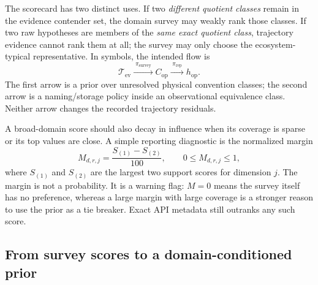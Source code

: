 \documentclass[11pt]{article}
\begin{document}
    The scorecard has two distinct uses. If two \emph{different quotient classes} remain in
    the evidence contender set, the domain survey may weakly rank those classes. If two raw
    hypotheses are members of the \emph{same exact quotient class}, trajectory evidence cannot
    rank them at all; the survey may only choose the ecosystem-typical representative. In
    symbols, the intended flow is
    \begin{equation}
        \boxed{
            \mathcal T_{\mathrm{ev}}
            \xrightarrow{\;\pi_{\mathrm{survey}}\;}
            C_{\mathrm{op}}
            \xrightarrow{\;\pi_{\mathrm{rep}}\;}
            h_{\mathrm{op}}.}
        \label{eq:survey-two-level-use}
    \end{equation}
    The first arrow is a prior over unresolved physical convention classes; the second arrow
    is a naming/storage policy inside an observational equivalence class. Neither arrow
    changes the recorded trajectory residuals.

    A broad-domain score should also decay in influence when its coverage is sparse or its
    top values are close. A simple reporting diagnostic is the normalized margin
    \begin{equation}
        M_{d,r,j}=\frac{S_{(1)}-S_{(2)}}{100},
        \qquad 0\le M_{d,r,j}\le1,
        \label{eq:survey-margin}
    \end{equation}
    where $S_{(1)}$ and $S_{(2)}$ are the largest two support scores for dimension $j$.
    The margin is not a probability. It is a warning flag: $M=0$ means the survey itself
    has no preference, whereas a large margin with large coverage is a stronger reason to
    use the prior as a tie breaker. Exact API metadata still outranks any such score.

    \subsection{From survey scores to a domain-conditioned prior}
\end{document}
